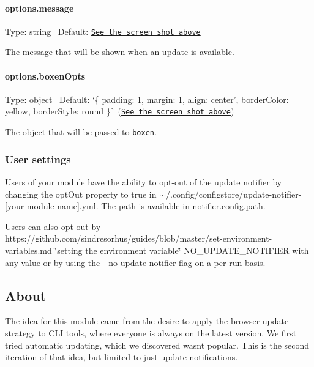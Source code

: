 \paragraph*{options.\+message}

Type\+: {\ttfamily string}~\newline
 Default\+: \href{https://github.com/yeoman/update-notifier#update-notifier-}{\tt See the screen shot above}

The message that will be shown when an update is available.

\paragraph*{options.\+boxen\+Opts}

Type\+: {\ttfamily object}~\newline
 Default\+: `\{ padding\+: 1, margin\+: 1, align\+: \textquotesingle{}center', border\+Color\+: \textquotesingle{}yellow\textquotesingle{}, border\+Style\+: \textquotesingle{}round\textquotesingle{} \}\`{} (\href{https://github.com/yeoman/update-notifier#update-notifier-}{\tt See the screen shot above})

The object that will be passed to \href{https://github.com/sindresorhus/boxen}{\tt boxen}.

\subsubsection*{User settings}

Users of your module have the ability to opt-\/out of the update notifier by changing the {\ttfamily opt\+Out} property to {\ttfamily true} in {\ttfamily $\sim$/.config/configstore/update-\/notifier-\/\mbox{[}your-\/module-\/name\mbox{]}.yml}. The path is available in {\ttfamily notifier.\+config.\+path}.

Users can also opt-\/out by https\+://github.com/sindresorhus/guides/blob/master/set-\/environment-\/variables.\+md \char`\"{}setting the environment variable\char`\"{} {\ttfamily N\+O\+\_\+\+U\+P\+D\+A\+T\+E\+\_\+\+N\+O\+T\+I\+F\+I\+ER} with any value or by using the {\ttfamily -\/-\/no-\/update-\/notifier} flag on a per run basis.

\subsection*{About}

The idea for this module came from the desire to apply the browser update strategy to C\+LI tools, where everyone is always on the latest version. We first tried automatic updating, which we discovered wasn\textquotesingle{}t popular. This is the second iteration of that idea, but limited to just update notifications.

